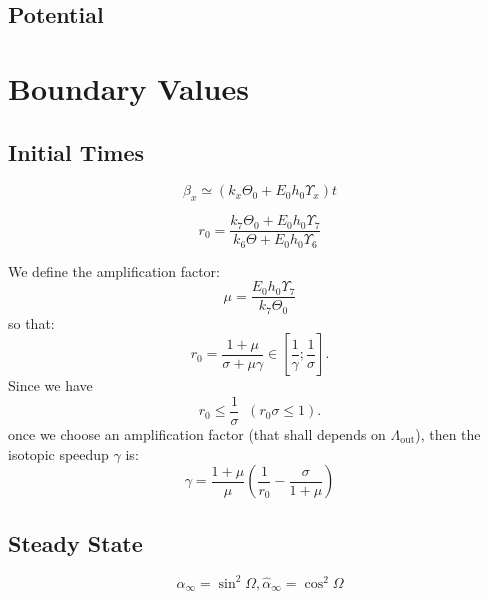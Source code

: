\documentclass[aps,onecolumn,12pt]{revtex4}
\newcommand{\LiAll}{\Lambda}
\newcommand{\LiAllOut}{{\LiAll}_{\mathrm{out}}}
\begin{document}
\subsection{Potential}



\section{Boundary Values}

\subsection{Initial Times}

\begin{equation}
	\beta_x \simeq \left( k_x \Theta_0 + E_0 h_0 \Upsilon_x \right) t 
\end{equation}

\begin{equation}
	r_0 = \dfrac{k_7 \Theta_0 + E_0 h_0 \Upsilon_7}{k_6 \Theta + E_0 h_0 \Upsilon_6 }
\end{equation}

We define the amplification factor:
\begin{equation}
	\mu = \dfrac{E_0 h_0 \Upsilon_7}{k_7\Theta_0}
\end{equation}
so that:
\begin{equation}
	r_0 = \dfrac{1+\mu}{\sigma+\mu\gamma} \in \left[ \dfrac{1}{\gamma};\dfrac{1}{\sigma}\right].
\end{equation}
Since we have
\begin{equation}
	r_0 \leq \dfrac{1}{\sigma} \;\; \left(r_0\sigma \leq 1 \right).
\end{equation}
once we choose an amplification factor (that shall depends on $\LiAllOut$), then
the isotopic speedup $\gamma$ is:
\begin{equation}
	\gamma = \dfrac{1+\mu}{\mu}\left(\dfrac{1}{r_0} - \dfrac{\sigma}{1+\mu}\right)
\end{equation}

\subsection{Steady State}
\begin{equation}
	\alpha_\infty = \sin^2 \Omega, \hat\alpha_\infty = \cos^2 \Omega
\end{equation}
\end{document}
